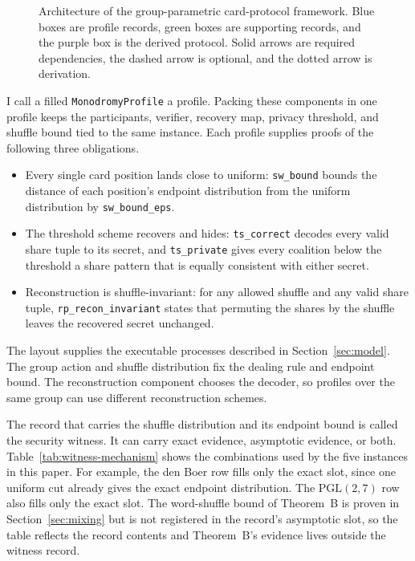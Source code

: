 \documentclass[runningheads]{llncs}
\newcommand{\coqin}[1]{\texttt{#1}}
\newcommand{\PG}{\mathrm{PGL}(2,7)}
\begin{document}
\begin{figure}[H]
{}
  \caption{Architecture of the group-parametric card-protocol framework.
  Blue boxes are profile records, green boxes are supporting records, and
  the purple box is the derived protocol. Solid arrows are required
  dependencies, the dashed arrow is optional, and the dotted arrow is
  derivation.}
  \label{fig:framework-architecture}
\end{figure}

I call a filled \coqin{MonodromyProfile} a profile. Packing these
components in one profile keeps the participants, verifier,
recovery map, privacy threshold, and shuffle bound tied to the same
instance. Each profile supplies proofs of the following three obligations.
\begin{itemize}
\item Every single card position lands close to uniform: \coqin{sw\_bound}
  bounds the distance of each position's endpoint distribution from the
  uniform distribution by \coqin{sw\_bound\_eps}.
\item The threshold scheme recovers and hides: \coqin{ts\_correct} decodes
  every valid share tuple to its secret, and \coqin{ts\_private} gives
  every coalition below the threshold a share pattern that is equally
  consistent with either secret.
\item Reconstruction is shuffle-invariant: for any allowed shuffle and any
  valid share tuple, \coqin{rp\_recon\_invariant} states that permuting the
  shares by the shuffle leaves the recovered secret unchanged.
\end{itemize}

The layout supplies the executable processes described in
Section~\ref{sec:model}. The group action and shuffle distribution fix the
dealing rule and endpoint bound. The reconstruction component chooses the
decoder, so profiles over the same group can use different reconstruction
schemes.

The record that carries the shuffle distribution and its endpoint bound
is called the security witness. It can carry exact evidence, asymptotic
evidence, or both. Table~\ref{tab:witness-mechanism} shows the combinations used by the
five instances in this paper. For example, the den Boer row fills only
the exact slot, since one uniform cut already gives the exact endpoint
distribution. The $\PG$ row also fills only the exact slot. The
word-shuffle bound of Theorem~B is proven in Section~\ref{sec:mixing} but
is not registered in the record's asymptotic slot, so the table reflects
the record contents and Theorem~B's evidence lives outside the witness
record.
\end{document}
